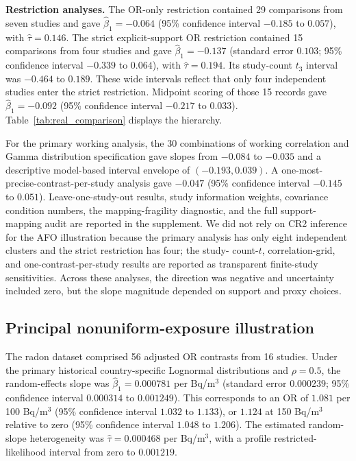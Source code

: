 \documentclass[journal=rsm]{CUP-JNL-DTM}%
\theoremstyle{definition}
\numberwithin{equation}{section}
\begin{document}
\noindent\textbf{Restriction analyses.}
The OR-only restriction contained 29 comparisons from seven studies and gave
$\hat\beta_1=-0.064$ (95\% confidence interval $-0.185$ to $0.057$), with
$\hat\tau=0.146$. The strict explicit-support OR restriction contained 15
comparisons from four studies and gave $\hat\beta_1=-0.137$ (standard error
$0.103$; 95\% confidence interval $-0.339$ to $0.064$), with
$\hat\tau=0.194$. Its study-count $t_3$ interval was $-0.464$ to $0.189$.
These wide intervals reflect that only four independent studies enter the
strict restriction. Midpoint scoring of those 15 records gave
$\hat\beta_1=-0.092$ (95\% confidence interval $-0.217$ to $0.033$).
Table~\ref{tab:real_comparison} displays the hierarchy.

For the primary working analysis, the 30 combinations of working correlation
and Gamma distribution specification gave slopes from $-0.084$ to $-0.035$ and
a descriptive model-based interval envelope of $(-0.193,0.039)$. A
one-most-precise-contrast-per-study analysis gave $-0.047$ (95\% confidence
interval $-0.145$ to $0.051$). Leave-one-study-out results, study information
weights, covariance condition numbers, the mapping-fragility diagnostic, and
the full support-mapping audit are reported in the supplement. We did not rely
on CR2 inference for the AFO illustration because the primary analysis has only
eight independent clusters and the strict restriction has four; the study-
count-$t$, correlation-grid, and one-contrast-per-study results are reported as
transparent finite-study sensitivities. Across
these analyses, the direction was negative and uncertainty included zero, but
the slope magnitude depended on support and proxy choices.

\subsection{Principal nonuniform-exposure illustration}

The radon dataset comprised 56 adjusted OR contrasts from 16 studies. Under the
primary historical country-specific Lognormal distributions and $\rho=0.5$,
the random-effects slope was $\hat\beta_1=0.000781$ per Bq/m$^3$ (standard
error $0.000239$; 95\% confidence interval $0.000314$ to $0.001249$). This
corresponds to an OR of $1.081$ per 100 Bq/m$^3$ (95\% confidence interval
$1.032$ to $1.133$), or $1.124$ at 150 Bq/m$^3$ relative to zero (95\%
confidence interval $1.048$ to $1.206$). The estimated random-slope
heterogeneity was $\hat\tau=0.000468$ per Bq/m$^3$, with a profile
restricted-likelihood interval from zero to $0.001219$.
\end{document}
